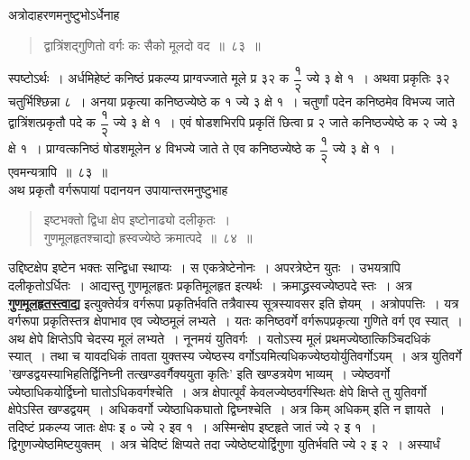 \documentclass[11pt, openany]{book}
\begin{document}
\vspace{-2mm}
 अत्रोदाहरणमनुष्टुभोऽर्धेनाह\textendash
\newpage
 \begin{quote}
     \eg 
     द्वात्रिंशद्गुणितो वर्गः कः सैको मूलदो वद~॥~८३~॥~
 \end{quote}
 
 स्पष्टोऽर्थः~। अर्धमिहेष्टं कनिष्ठं प्रकल्प्य प्राग्वज्जाते मूले प्र
३२ क $\dfrac{\mbox{१}}{\mbox{२}}$ ज्ये ३ क्षे १~। 
अथवा प्रकृतिः ३२ चतुर्भिश्छिन्ना ८~। अनया प्रकृत्या कनिष्ठज्येष्ठे क १
ज्ये ३ 
क्षे १~। चतुर्णां पदेन कनिष्ठमेव विभज्य जाते द्वात्रिंशत्प्रकृतौ पदे क
$\dfrac{\mbox{१}}{\mbox{२}}$ ज्ये ३ क्षे १~। 
एवं षोडशभिरपि प्रकृतिं छित्वा प्र २ जाते कनिष्ठज्येष्ठे क २ ज्ये ३ क्षे
१~। 
प्राग्वत्कनिष्ठं षोडशमूलेन ४ विभज्ये जाते ते एव कनिष्ठज्येष्ठे क $\dfrac{\mbox{१}}{\mbox{२}}$
ज्ये ३ क्षे १~। 
एवमन्यत्रापि~॥~८३~॥~\\

\vspace{-2mm}
 अथ प्रकृतौ वर्गरूपायां पदानयन उपायान्तरमनुष्टुभाह\textendash

 \label{84}
\begin{quote}
    \ab 
     इष्टभक्तो द्विधा क्षेप इष्टोनाढ्यो दलीकृतः~। \\
 गुणमूलहृतश्चाद्यो ह्रस्वज्येष्ठे क्रमात्पदे~॥~८४~॥~
\end{quote}

 उद्दिष्टक्षेप इष्टेन भक्तः सन्द्विधा स्थाप्यः~। स एकत्रेष्टेनोनः~।
अपरत्रेष्टेन युतः~। उभयत्रापि दलीकृतोऽर्धितः~। आद्यस्तु गुणमूलहृतः प्रकृतिमूलहृत
इत्यर्थः~। क्रमाद्ध्रस्वज्येष्ठपदे स्तः~। अत्र \hyperref[84]{\textbf{गुणमूलहृतस्त्वाद्य}} इत्युक्तेर्यत्र
वर्गरूपा प्रकृतिर्भवति 
तत्रैवास्य सूत्रस्यावसर इति ज्ञेयम्~। अत्रोपपत्तिः~। यत्र वर्गरूपा
प्रकृतिस्तत्र 
क्षेपाभाव एव ज्येष्ठमूलं लभ्यते~। यतः कनिष्ठवर्गे वर्गरूपप्रकृत्या
गुणिते वर्ग 
एव स्यात्~। अथ क्षेपे क्षिप्तेऽपि चेदस्य मूलं लभ्यते~। नूनमयं युतिवर्गः~। 
यतोऽस्य मूलं प्रथमज्येष्ठात्किञ्चिदधिकं स्यात्~। तथा च यावदधिकं तावता 
युक्तस्य ज्येष्ठस्य वर्गोऽयमित्यधिकज्येष्ठयोर्युतिवर्गोऽयम्~। अत्र
युतिवर्गे {\qt 'खण्डद्वयस्याभिहतिर्द्विनिघ्नी तत्खण्डवर्गैक्ययुता कृतिः'} इति खण्डत्रयेण भाव्यम्~।
ज्येष्ठवर्गो ज्येष्ठाधिकयोर्द्विघ्नो घातोऽधिकवर्गश्चेति~। अत्र क्षेपात्पूर्वं
केवलज्येष्ठवर्गस्थितः क्षेपे 
क्षिप्ते तु युतिवर्गो क्षेपेऽस्ति खण्डद्वयम्~। अधिकवर्गो
ज्येष्ठाधिकघातो द्विघ्नश्चेति~। 
अत्र किम् अधिकम् इति न ज्ञायते~। तदिष्टं प्रकल्प्य जातः क्षेपः इ ० ज्ये २ 
इव १~। अस्मिन्क्षेप इष्टहृते जातं ज्ये २ इ १~।
द्विगुणज्येष्ठमिष्टयुक्तम्~। 
अत्र चेदिष्टं क्षिप्यते तदा ज्येष्ठेष्टयोर्द्विगुणा युतिर्भवति ज्ये २ इ
२~। अस्यार्धं
\newpage%
\end{document}
